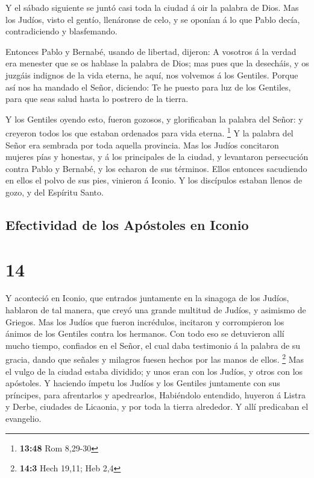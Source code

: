 Y el sábado siguiente se juntó casi toda la ciudad á oir
la palabra de Dios.  Mas los Judíos, visto el gentío,
llenáronse de celo, y se oponían á lo que Pablo decía, contradiciendo y
blasfemando.

 Entonces Pablo y Bernabé, usando de libertad, dijeron: A
vosotros á la verdad era menester que se os hablase la palabra de Dios;
mas pues que la desecháis, y os juzgáis indignos de la vida eterna, he
aquí, nos volvemos á los Gentiles.  Porque así nos ha
mandado el Señor, diciendo: Te he puesto para luz de los Gentiles, para
que seas salud hasta lo postrero de la tierra.

 Y los Gentiles oyendo esto, fueron gozosos, y
glorificaban la palabra del Señor: y creyeron todos los que estaban
ordenados para vida eterna. \footnote{\textbf{13:48} Rom 8,29-30}
 Y la palabra del Señor era sembrada por toda aquella
provincia.  Mas los Judíos concitaron mujeres pías y
honestas, y á los principales de la ciudad, y levantaron persecución
contra Pablo y Bernabé, y los echaron de sus términos. 
Ellos entonces sacudiendo en ellos el polvo de sus pies, vinieron á
Iconio.  Y los discípulos estaban llenos de gozo, y del
Espíritu Santo.

\hypertarget{efectividad-de-los-apuxf3stoles-en-iconio}{%
\subsection{Efectividad de los Apóstoles en
Iconio}\label{efectividad-de-los-apuxf3stoles-en-iconio}}

\hypertarget{section-13}{%
\section{14}\label{section-13}}

 Y aconteció en Iconio, que entrados juntamente en la
sinagoga de los Judíos, hablaron de tal manera, que creyó una grande
multitud de Judíos, y asimismo de Griegos.  Mas los Judíos
que fueron incrédulos, incitaron y corrompieron los ánimos de los
Gentiles contra los hermanos.  Con todo eso se detuvieron
allí mucho tiempo, confiados en el Señor, el cual daba testimonio á la
palabra de su gracia, dando que señales y milagros fuesen hechos por las
manos de ellos. \footnote{\textbf{14:3} Hech 19,11; Heb 2,4}
 Mas el vulgo de la ciudad estaba dividido; y unos eran
con los Judíos, y otros con los apóstoles.  Y haciendo
ímpetu los Judíos y los Gentiles juntamente con sus príncipes, para
afrentarlos y apedrearlos,  Habiéndolo entendido, huyeron
á Listra y Derbe, ciudades de Licaonia, y por toda la tierra alrededor.
 Y allí predicaban el evangelio.

